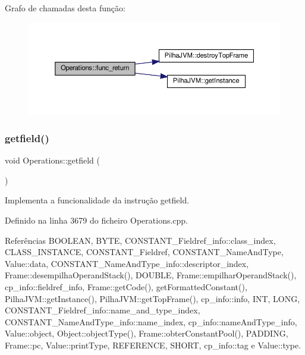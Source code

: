 Grafo de chamadas desta função\+:
\nopagebreak
\begin{figure}[H]
\begin{center}
\leavevmode
\includegraphics[width=350pt]{classOperations_aa33b77fb62f7e76c347503c97c6b080b_cgraph}
\end{center}
\end{figure}
\mbox{\label{classOperations_a0bb399fe0f64dc21699132c092560e19}} 
\subsubsection{\texorpdfstring{getfield()}{getfield()}}
{\footnotesize\ttfamily void Operations\+::getfield (\begin{DoxyParamCaption}{ }\end{DoxyParamCaption})\hspace{0.3cm}{\ttfamily [private]}}



Implementa a funcionalidade da instrução getfield. 



Definido na linha 3679 do ficheiro Operations.\+cpp.



Referências B\+O\+O\+L\+E\+AN, B\+Y\+TE, C\+O\+N\+S\+T\+A\+N\+T\+\_\+\+Fieldref\+\_\+info\+::class\+\_\+index, C\+L\+A\+S\+S\+\_\+\+I\+N\+S\+T\+A\+N\+CE, C\+O\+N\+S\+T\+A\+N\+T\+\_\+\+Fieldref, C\+O\+N\+S\+T\+A\+N\+T\+\_\+\+Name\+And\+Type, Value\+::data, C\+O\+N\+S\+T\+A\+N\+T\+\_\+\+Name\+And\+Type\+\_\+info\+::descriptor\+\_\+index, Frame\+::desempilha\+Operand\+Stack(), D\+O\+U\+B\+LE, Frame\+::empilhar\+Operand\+Stack(), cp\+\_\+info\+::fieldref\+\_\+info, Frame\+::get\+Code(), get\+Formatted\+Constant(), Pilha\+J\+V\+M\+::get\+Instance(), Pilha\+J\+V\+M\+::get\+Top\+Frame(), cp\+\_\+info\+::info, I\+NT, L\+O\+NG, C\+O\+N\+S\+T\+A\+N\+T\+\_\+\+Fieldref\+\_\+info\+::name\+\_\+and\+\_\+type\+\_\+index, C\+O\+N\+S\+T\+A\+N\+T\+\_\+\+Name\+And\+Type\+\_\+info\+::name\+\_\+index, cp\+\_\+info\+::name\+And\+Type\+\_\+info, Value\+::object, Object\+::object\+Type(), Frame\+::obter\+Constant\+Pool(), P\+A\+D\+D\+I\+NG, Frame\+::pc, Value\+::print\+Type, R\+E\+F\+E\+R\+E\+N\+CE, S\+H\+O\+RT, cp\+\_\+info\+::tag e Value\+::type.



